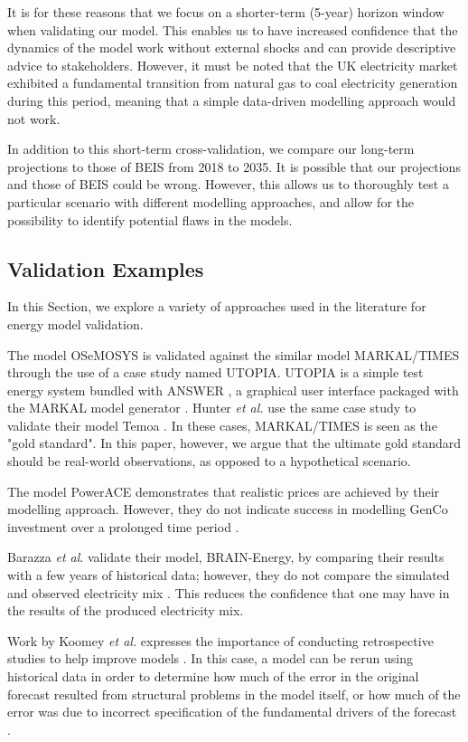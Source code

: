It is for these reasons that we focus on a shorter-term (5-year) horizon window when validating our model. This enables us to have increased confidence that the dynamics of the model work without external shocks and can provide descriptive advice to stakeholders. However, it must be noted that the UK electricity market exhibited a fundamental transition from natural gas to coal electricity generation during this period, meaning that a simple data-driven modelling approach would not work.

In addition to this short-term cross-validation, we compare our long-term projections to those of BEIS from 2018 to 2035. It is possible that our projections and those of BEIS could be wrong. However, this allows us to thoroughly test a particular scenario with different modelling approaches, and allow for the possibility to identify potential flaws in the models.


\subsection{Validation Examples}

In this Section, we explore a variety of approaches used in the literature for energy model validation.

The model OSeMOSYS \cite{Howells2011} is validated against the similar model MARKAL\slash TIMES through the use of a case study named UTOPIA. UTOPIA is a simple test energy system bundled with ANSWER \cite{Hunter2013}, a graphical user interface packaged with the MARKAL model generator \cite{Noble2004}. Hunter \textit{et al.} use the same case study to validate their model Temoa \cite{Hunter2013}. In these cases, MARKAL\slash TIMES is seen as the "gold standard". In this paper, however, we argue that the ultimate gold standard should be real-world observations, as opposed to a hypothetical scenario.

The model PowerACE demonstrates that realistic prices are achieved by their modelling approach. However, they do not indicate success in modelling GenCo investment over a prolonged time period \cite{Ringler2012}.

Barazza \textit{et al}. validate their model, BRAIN-Energy, by comparing their results with a few years of historical data; however, they do not compare the simulated and observed electricity mix \cite{Barazza2020}. This reduces the confidence that one may have in the results of the produced electricity mix.

Work by Koomey \textit{et al.} expresses the importance of conducting retrospective studies to help improve models \cite{Koomey2003}. In this case, a model can be rerun using historical data in order to determine how much of the error in the original forecast resulted from structural problems in the model itself, or how much of the error was due to incorrect specification of the fundamental drivers of the forecast \cite{Koomey2003}.

